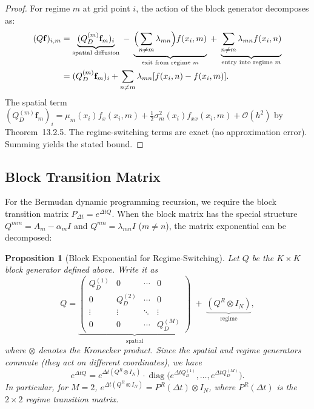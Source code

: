 \documentclass[11pt,a4paper,openany]{book}
\theoremstyle{definition}
\theoremstyle{plain}
\newtheorem{proposition}[theorem]{Proposition}
\theoremstyle{remark}
\newcommand{\1}{\mathbbm{1}}
\begin{document}
\begin{proof}
For regime $m$ at grid point $i$, the action of the block generator decomposes as:
\[
\begin{aligned}
(Q \mathbf{f})_{i,m} &= \underbrace{(Q_{D}^{(m)} \mathbf{f}_{m})_{i}}_{\text{spatial diffusion}} \;-\; \underbrace{\Bigl(\sum_{n \neq m} \lambda_{mn}\Bigr) f(x_{i},m)}_{\text{exit from regime } m} \;+\; \underbrace{\sum_{n \neq m} \lambda_{mn} f(x_{i},n)}_{\text{entry into regime } m} \\
&= (Q_{D}^{(m)} \mathbf{f}_{m})_{i} + \sum_{n \neq m} \lambda_{mn} [f(x_{i},n) - f(x_{i},m)].
\end{aligned}
\]
The spatial term $(Q_{D}^{(m)} \mathbf{f}_{m})_{i} = \mu_{m}(x_{i}) f_{x}(x_{i},m) + \frac{1}{2} \sigma_{m}^{2}(x_{i}) f_{xx}(x_{i},m) + \mathcal{O}(h^{2})$ by Theorem~13.2.5. The regime-switching terms are exact (no approximation error). Summing yields the stated bound.
\end{proof}

\subsection{Block Transition Matrix}

For the Bermudan dynamic programming recursion, we require the block transition matrix $P_{\Delta t} = e^{\Delta t Q}$. When the block matrix has the special structure $Q^{mm} = A_{m} - \alpha_{m} I$ and $Q^{mn} = \lambda_{mn} I$ ($m \neq n$), the matrix exponential can be decomposed:

\begin{proposition}[Block Exponential for Regime-Switching]
Let $Q$ be the $K \times K$ block generator defined above. Write it as
\[
Q = \underbrace{\begin{pmatrix}
Q_{D}^{(1)} & 0 & \cdots & 0 \\
0 & Q_{D}^{(2)} & \cdots & 0 \\
\vdots & \vdots & \ddots & \vdots \\
0 & 0 & \cdots & Q_{D}^{(M)}
\end{pmatrix}}_{\text{spatial}} \;+\; \underbrace{(Q^{R} \otimes I_{N})}_{\text{regime}},
\]
where $\otimes$ denotes the Kronecker product. Since the spatial and regime generators commute (they act on different coordinates), we have
\[
e^{\Delta t Q} = e^{\Delta t (Q^{R} \otimes I_{N})} \cdot \operatorname{diag}\bigl(e^{\Delta t Q_{D}^{(1)}}, \ldots, e^{\Delta t Q_{D}^{(M)}}\bigr).
\]
In particular, for $M=2$, $e^{\Delta t (Q^{R} \otimes I_{N})} = P^{R}(\Delta t) \otimes I_{N}$, where $P^{R}(\Delta t)$ is the $2 \times 2$ regime transition matrix.
\end{proposition}
\end{document}
